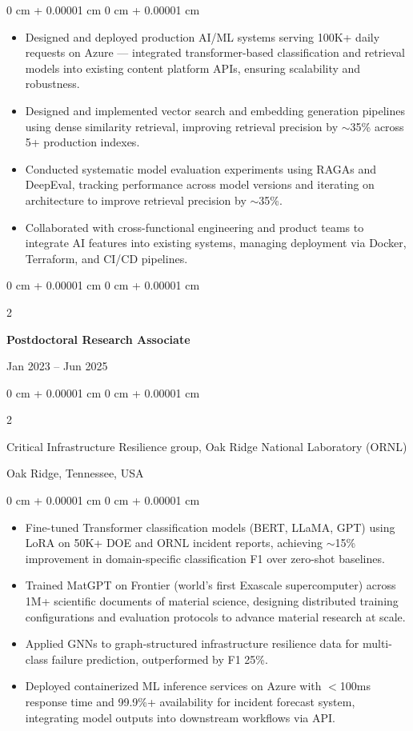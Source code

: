 \documentclass[10pt, letterpaper]{article}
\newenvironment{highlights}{
    \begin{itemize}[
        topsep=0.10 cm,
        parsep=0.10 cm,
        partopsep=0pt,
        itemsep=0pt,
        leftmargin=0 cm + 10pt
    ]
}{
    \end{itemize}
} %
\newenvironment{onecolentry}{
    \begin{adjustwidth}{
        0 cm + 0.00001 cm
    }{
        0 cm + 0.00001 cm
    }
}{
    \end{adjustwidth}
} %
\newenvironment{twocolentry}[2][]{
    \onecolentry
    \def\secondColumn{#2}
    \setcolumnwidth{\fill, 4.5 cm}
    \begin{paracol}{2}
}{
    \switchcolumn \raggedleft \secondColumn
    \end{paracol}
    \endonecolentry
} %
\begin{document}
    \begin{onecolentry}
        \begin{highlights}
            \item Designed and deployed production AI/ML systems serving 100K+ daily requests on Azure — integrated transformer-based classification and retrieval models into existing content platform APIs, ensuring scalability and robustness.
            \item Designed and implemented vector search and embedding generation pipelines using dense similarity retrieval, improving retrieval precision by $\sim$35\% across 5+ production indexes.
            \item Conducted systematic model evaluation experiments using RAGAs and DeepEval, tracking performance across model versions and iterating on architecture to improve retrieval precision by $\sim$35\%.
            \item Collaborated with cross-functional engineering and product teams to integrate AI features into existing systems, managing deployment via Docker, Terraform, and CI/CD pipelines.
        \end{highlights}
    \end{onecolentry}

\vspace{1mm}

    \begin{twocolentry}{Jan 2023 -- Jun 2025}
        \textbf{Postdoctoral Research Associate}
    \end{twocolentry}
    \begin{twocolentry}{Oak Ridge, Tennessee, USA}
        Critical Infrastructure Resilience group, Oak Ridge National Laboratory (ORNL)
    \end{twocolentry}
    \vspace{0.10 cm}
    \begin{onecolentry}
        \begin{highlights}
            \item Fine-tuned Transformer classification models (BERT, LLaMA, GPT) using LoRA on 50K+ DOE and ORNL incident reports, achieving $\sim$15\% improvement in domain-specific classification F1 over zero-shot baselines.
            \item Trained MatGPT on Frontier (world’s first Exascale supercomputer) across 1M+ scientific documents of material science, designing distributed training configurations and evaluation protocols to advance material research at scale.
            \item Applied GNNs to graph-structured infrastructure resilience data for multi-class failure prediction, outperformed by F1 25\%.
            \item Deployed containerized ML inference services on Azure with $<$100ms response time and 99.9\%+ availability for incident forecast system, integrating model outputs into downstream workflows via API.
        \end{highlights}
    \end{onecolentry}
\end{document}
